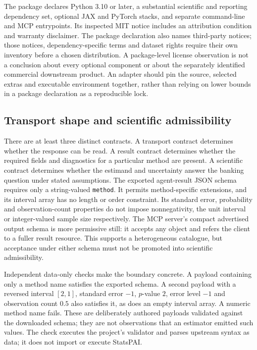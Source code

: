 The package declares Python 3.10 or later, a substantial scientific and reporting
dependency set, optional JAX and PyTorch stacks, and separate command-line and
MCP entrypoints. Its inspected MIT notice includes an attribution condition and
warranty disclaimer. The package declaration also names third-party notices;
those notices, dependency-specific terms and dataset rights require their own
inventory before a chosen distribution. A package-level license observation
is not a conclusion about every optional component or about the separately
identified commercial downstream product. An adapter should pin the source,
selected extras and executable environment together, rather than relying on
lower bounds in a package declaration as a reproducible lock.
\citep{exec23_statspai_contract}

\subsection{Transport shape and scientific admissibility}
\label{exec23:statspai-contract-schema}
There are at least three distinct contracts. A transport contract determines
whether the response can be read. A result contract determines whether the
required fields and diagnostics for a particular method are present. A
scientific contract determines whether the estimand and uncertainty answer the
banking question under stated assumptions. The exported agent-result JSON
schema requires only a string-valued \texttt{method}. It permits method-specific
extensions, and its interval array has no length or order constraint. Its
standard error, probability and observation-count properties do not impose
nonnegativity, the unit interval or integer-valued sample size respectively.
The MCP server's compact advertised output schema is more permissive still:
it accepts any object and refers the client to a fuller result resource.
This supports a heterogeneous catalogue, but acceptance under either schema
must not be promoted into scientific admissibility.
\citep{exec23_statspai_contract}

Independent data-only checks make the boundary concrete. A payload containing
only a method name satisfies the exported schema. A second payload with a
reversed interval $[2,1]$, standard error $-1$, $p$-value $2$, error level $-1$
and observation count $0.5$ also satisfies it, as does an empty interval array.
A numeric method name fails. These are deliberately authored payloads validated
against the downloaded schema; they are not observations that an estimator
emitted such values. The check executes the project's validator and parses
upstream syntax as data; it does not import or execute StatsPAI.
\citep{exec23_statspai_contract_reference}

